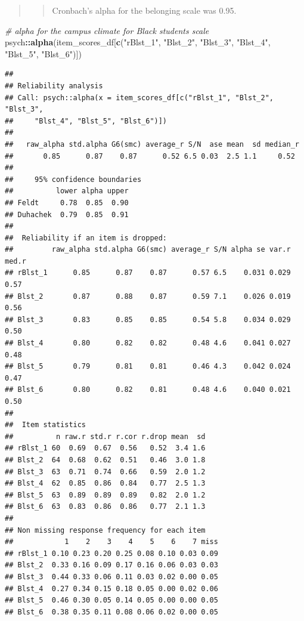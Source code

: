 \documentclass[
  11pt,
]{book}
\newenvironment{Shaded}{\begin{snugshade}}{\end{snugshade}}
\newcommand{\CommentTok}[1]{\textcolor[rgb]{0.37,0.37,0.37}{\textit{#1}}}
\newcommand{\FunctionTok}[1]{\textcolor[rgb]{0.27,0.27,0.27}{\textbf{#1}}}
\newcommand{\NormalTok}[1]{#1}
\newcommand{\SpecialCharTok}[1]{\textcolor[rgb]{0.43,0.43,0.43}{\textbf{#1}}}
\newcommand{\StringTok}[1]{\textcolor[rgb]{0.5,0.5,0.5}{#1}}
\begin{document}
\begin{quote}
\begin{quote}
Cronbach's alpha for the belonging scale was 0.95.
\end{quote}
\end{quote}

\begin{Shaded}
\begin{Highlighting}[]
\CommentTok{\# alpha for the campus climate for Black students scale}
\NormalTok{psych}\SpecialCharTok{::}\FunctionTok{alpha}\NormalTok{(item\_scores\_df[}\FunctionTok{c}\NormalTok{(}\StringTok{"rBlst\_1"}\NormalTok{, }\StringTok{"Blst\_2"}\NormalTok{, }\StringTok{"Blst\_3"}\NormalTok{, }\StringTok{"Blst\_4"}\NormalTok{,}
    \StringTok{"Blst\_5"}\NormalTok{, }\StringTok{"Blst\_6"}\NormalTok{)])}
\end{Highlighting}
\end{Shaded}

\begin{verbatim}
## 
## Reliability analysis   
## Call: psych::alpha(x = item_scores_df[c("rBlst_1", "Blst_2", "Blst_3", 
##     "Blst_4", "Blst_5", "Blst_6")])
## 
##   raw_alpha std.alpha G6(smc) average_r S/N  ase mean  sd median_r
##       0.85      0.87    0.87      0.52 6.5 0.03  2.5 1.1     0.52
## 
##     95% confidence boundaries 
##          lower alpha upper
## Feldt     0.78  0.85  0.90
## Duhachek  0.79  0.85  0.91
## 
##  Reliability if an item is dropped:
##         raw_alpha std.alpha G6(smc) average_r S/N alpha se var.r med.r
## rBlst_1      0.85      0.87    0.87      0.57 6.5    0.031 0.029  0.57
## Blst_2       0.87      0.88    0.87      0.59 7.1    0.026 0.019  0.56
## Blst_3       0.83      0.85    0.85      0.54 5.8    0.034 0.029  0.50
## Blst_4       0.80      0.82    0.82      0.48 4.6    0.041 0.027  0.48
## Blst_5       0.79      0.81    0.81      0.46 4.3    0.042 0.024  0.47
## Blst_6       0.80      0.82    0.81      0.48 4.6    0.040 0.021  0.50
## 
##  Item statistics 
##          n raw.r std.r r.cor r.drop mean  sd
## rBlst_1 60  0.69  0.67  0.56   0.52  3.4 1.6
## Blst_2  64  0.68  0.62  0.51   0.46  3.0 1.8
## Blst_3  63  0.71  0.74  0.66   0.59  2.0 1.2
## Blst_4  62  0.85  0.86  0.84   0.77  2.5 1.3
## Blst_5  63  0.89  0.89  0.89   0.82  2.0 1.2
## Blst_6  63  0.83  0.86  0.86   0.77  2.1 1.3
## 
## Non missing response frequency for each item
##            1    2    3    4    5    6    7 miss
## rBlst_1 0.10 0.23 0.20 0.25 0.08 0.10 0.03 0.09
## Blst_2  0.33 0.16 0.09 0.17 0.16 0.06 0.03 0.03
## Blst_3  0.44 0.33 0.06 0.11 0.03 0.02 0.00 0.05
## Blst_4  0.27 0.34 0.15 0.18 0.05 0.00 0.02 0.06
## Blst_5  0.46 0.30 0.05 0.14 0.05 0.00 0.00 0.05
## Blst_6  0.38 0.35 0.11 0.08 0.06 0.02 0.00 0.05
\end{verbatim}
\end{document}
